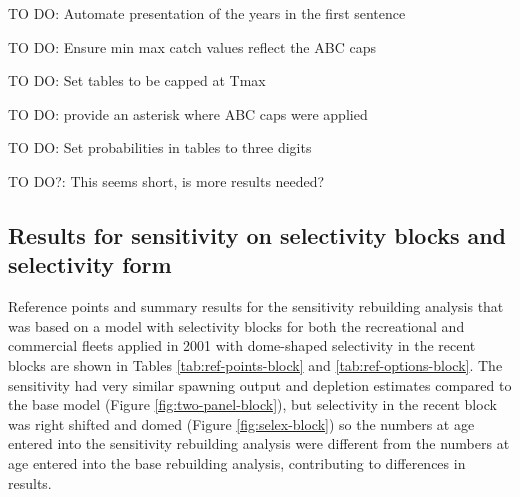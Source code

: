 \documentclass[11pt,
  english,
  a4paper,
]{article}
\begin{document}
\leavevmode\tagmcend\tagstructend\par


TO DO: Automate presentation of the years in the first sentence

\leavevmode\tagmcend\tagstructend\par


TO DO: Ensure min max catch values reflect the ABC caps

\leavevmode\tagmcend\tagstructend\par


TO DO: Set tables to be capped at Tmax

\leavevmode\tagmcend\tagstructend\par


TO DO: provide an asterisk where ABC caps were applied

\leavevmode\tagmcend\tagstructend\par


TO DO: Set probabilities in tables to three digits

\leavevmode\tagmcend\tagstructend\par


TO DO?: This seems short, is more results needed?

\leavevmode\tagmcend\tagstructend\par


\hypertarget{results-for-sensitivity-on-selectivity-blocks-and-selectivity-form}{%
\subsection{Results for sensitivity on selectivity blocks and selectivity form}\label{results-for-sensitivity-on-selectivity-blocks-and-selectivity-form}}

\leavevmode\tagmcend\tagstructend


Reference points and summary results for the sensitivity rebuilding analysis that was based on a model with selectivity blocks for both the recreational and commercial fleets applied in 2001 with dome-shaped selectivity in the recent blocks are shown in Tables \ref{tab:ref-points-block} and \ref{tab:ref-options-block}. The sensitivity had very similar spawning output and depletion estimates compared to the base model (Figure \ref{fig:two-panel-block}), but selectivity in the recent block was right shifted and domed (Figure \ref{fig:selex-block}) so the numbers at age entered into the sensitivity rebuilding analysis were different from the numbers at age entered into the base rebuilding analysis, contributing to differences in results.
\end{document}
